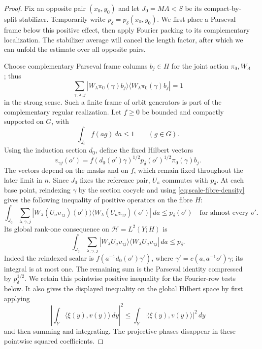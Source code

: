 \begin{proof}
Fix an opposite pair $(x_0,y_0)$ and let $J_0=MA<S$ be its
compact-by-split stabilizer. Temporarily write
$p_\delta=p_\delta(x_0,y_0)$. We first place a Parseval frame below this
positive effect, then apply Fourier packing to its complementary
localization. The stabilizer average will cancel the length factor,
after which we can unfold the estimate over all opposite pairs.

Choose complementary Parseval frame columns $b_j\in H$ for the joint
action $\pi_0,W_\Lambda$; thus
\[
 \sum_{\gamma,\lambda,j}
 |W_\lambda\pi_0(\gamma)b_j\rangle
 \langle W_\lambda\pi_0(\gamma)b_j|=1
\]
in the strong sense. Such a finite frame of orbit generators is part of
the complementary regular realization. Let $f\ge0$ be bounded and
compactly supported on $G$, with
\begin{equation}
 \int_{J_0}f(ag)\,da\le1\qquad(g\in G).
 \label{eq:scale-fibre-density}
\end{equation}
Using the induction section $d_0$, define the fixed Hilbert vectors
\[
 v_{\gamma j}(o')=
 f(d_0(o')\gamma)^{1/2}
 p_\delta(o')^{1/2}\pi_0(\gamma)b_j.
\]
The vectors depend on the masks and on $f$, which remain fixed throughout
the later limit in $n$. Since $J_0$ fixes the reference pair, $U_a$
commutes with $p_\delta$. At each base point, reindexing $\gamma$ by the
section cocycle and using \eqref{eq:scale-fibre-density} gives the
following inequality of positive operators on the fibre $H$:
\[
 \int_{J_0}\sum_{\lambda,\gamma,j}
 |W_\lambda(U_av_{\gamma j})(o')\rangle
 \langle W_\lambda(U_av_{\gamma j})(o')|\,da
 \le p_\delta(o')
 \quad\text{for almost every }o'.
\]
Its global rank-one consequence on $\mathcal H=L^2(Y;H)$ is
\begin{equation}
 \int_{J_0}\sum_{\lambda,\gamma,j}
 |W_\lambda U_av_{\gamma j}\rangle
 \langle W_\lambda U_av_{\gamma j}|\,da
 \le p_\delta.
 \label{eq:scale-stabilizer-frame}
\end{equation}
Indeed the reindexed scalar is $f(a^{-1}d_0(o')\gamma')$, where
$\gamma'=c(a,a^{-1}o')\gamma$; its integral is at most one. The
remaining sum is the Parseval identity compressed by
$p_\delta^{1/2}$. We retain this pointwise positive inequality for the
Fourier-row tests below. It also gives the displayed inequality
on the global Hilbert space by first applying
\[
 \left|\int_Y\langle\xi(y),v(y)\rangle\,dy\right|^2
 \le \int_Y|\langle\xi(y),v(y)\rangle|^2\,dy
\]
and then summing and integrating. The projective phases disappear in
these pointwise squared coefficients.


\end{proof}

